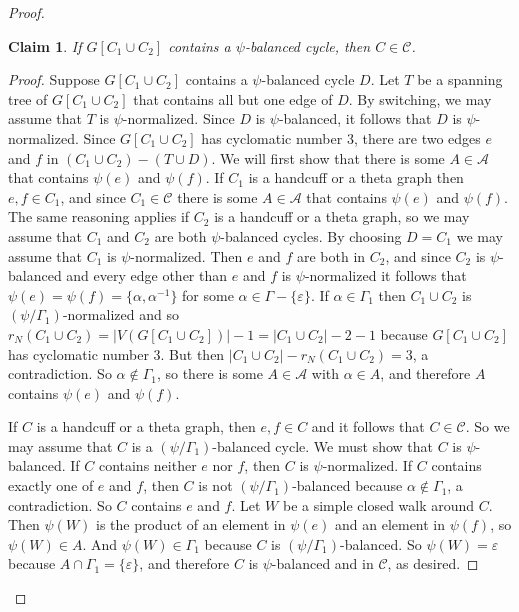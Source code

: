 \documentclass[10pt,a4paper]{amsart}
\newtheorem{claim}{Claim}
\newcommand{\cA}{\mathcal{A}}
\newcommand{\cC}{\mathcal{C}}
\newcommand{\ep}{\varepsilon}
\begin{document}
\begin{proof}
\begin{claim} \label{claim: no balanced cycles}
If $G[C_1 \cup C_2]$ contains a $\psi$-balanced cycle, then $C \in \cC$.
\end{claim}
\begin{proof}
Suppose $G[C_1 \cup C_2]$ contains a $\psi$-balanced cycle $D$.
Let $T$ be a spanning tree of $G[C_1 \cup C_2]$ that contains all but one edge of $D$.
By switching, we may assume that $T$ is $\psi$-normalized.
Since $D$ is $\psi$-balanced, it follows that $D$ is $\psi$-normalized.
Since $G[C_1 \cup C_2]$ has cyclomatic number $3$, there are two edges $e$ and $f$ in $(C_1 \cup C_2) - (T \cup D)$.
We will first show that there is some $A \in \cA$ that contains $\psi(e)$ and $\psi(f)$.
If $C_1$ is a handcuff or a theta graph then $e,f \in C_1$, and since $C_1 \in \cC$ there is some $A \in \cA$ that contains $\psi(e)$ and $\psi(f)$.
The same reasoning applies if $C_2$ is a handcuff or a theta graph, so we may assume that $C_1$ and $C_2$ are both $\psi$-balanced cycles.
By choosing $D = C_1$ we may assume that $C_1$ is $\psi$-normalized.
Then $e$ and $f$ are both in $C_2$, and since $C_2$ is $\psi$-balanced and every edge other than $e$ and $f$ is $\psi$-normalized it follows that $\psi(e) = \psi(f) = \{\alpha, \alpha^{-1}\}$ for some $\alpha \in \Gamma - \{\ep\}$.
If $\alpha \in \Gamma_1$ then $C_1 \cup C_2$ is $(\psi/\Gamma_1)$-normalized and so $r_N(C_1 \cup C_2) = |V(G[C_1 \cup C_2])| - 1 = |C_1 \cup C_2| - 2 - 1$ because $G[C_1 \cup C_2]$ has cyclomatic number $3$.
But then $|C_1 \cup C_2| - r_N(C_1 \cup C_2) = 3$, a contradiction.
So $\alpha \notin \Gamma_1$, so there is some $A \in \cA$ with $\alpha \in A$, and therefore $A$ contains $\psi(e)$ and $\psi(f)$.



If $C$ is a handcuff or a theta graph, then $e,f \in C$ and it follows that $C \in \cC$.
So we may assume that $C$ is a $(\psi/\Gamma_1)$-balanced cycle.
We must show that $C$ is $\psi$-balanced.
If $C$ contains neither $e$ nor $f$, then $C$ is $\psi$-normalized.
If $C$ contains exactly one of $e$ and $f$, then $C$ is not $(\psi/\Gamma_1)$-balanced because $\alpha \notin \Gamma_1$, a contradiction.
So $C$ contains $e$ and $f$.
Let $W$ be a simple closed walk around $C$.
Then $\psi(W)$ is the product of an element in $\psi(e)$ and an element in $\psi(f)$, so $\psi(W) \in A$.
And $\psi(W) \in \Gamma_1$ because $C$ is $(\psi/\Gamma_1)$-balanced.
So $\psi(W) = \ep$ because $A \cap \Gamma_1 = \{\ep\}$, and therefore $C$ is $\psi$-balanced and in $\cC$, as desired.
\end{proof}




\end{proof}
\end{document}
